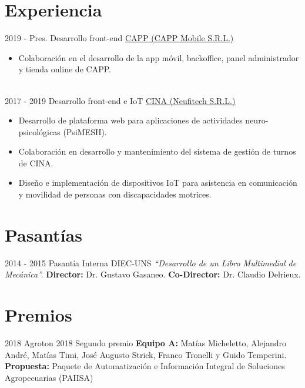 \documentclass[letterpaper]{twentysecondcv} %
\begin{document}
\section{Experiencia}
\begin{twenty} 
\twentyitem
        {2019 - Pres.}
        {}
        {Desarrollo front-end}
        {\href{http://www.webcapp.com/}{CAPP (CAPP Mobile S.R.L.)}}
        {}
        {\begin{itemize}
        \item Colaboración en el desarrollo de la app móvil, backoffice, panel administrador y tienda online de CAPP.
        \end{itemize}}\\
\twentyitem
        {2017 - 2019}
        {}
        {Desarrollo front-end e IoT}
        {\href{http://www.cinaweb.org/}{CINA (Neufitech S.R.L.)}}
        {}
        {\begin{itemize}
        \item Desarrollo de plataforma web para aplicaciones de actividades neuro-psicológicas (PsiMESH).
        \item Colaboración en desarrollo y mantenimiento del sistema de gestión de turnos de CINA.
        \item Diseño e implementación de dispositivos IoT para asistencia en comunicación y movilidad de personas con discapacidades motrices.
        \end{itemize}}
\end{twenty}

\vspace{2mm}

\section{Pasantías}
\begin{twenty}
    \twentyitem
        {2014 - 2015}
        {}
        {Pasantía Interna}
        {DIEC-UNS}
        {\textit{``Desarrollo de un Libro Multimedial de Mecánica''.}}
        {\textbf{Director:} Dr. Gustavo Gasaneo. \textbf{Co-Director:} Dr. Claudio Delrieux.} \\
\end{twenty}

\section{Premios}
\begin{twenty}
    \twentyitem
        {2018}
        {}
        {Agroton 2018}
        {Segundo premio}
        {\textbf{Equipo A:} Matías Micheletto, Alejandro André, Matías Timi, José Augusto Strick, Franco Tronelli y Guido Temperini.}
        {\textbf{Propuesta:} Paquete de Automatización e Información Integral de Soluciones Agropecuarias (PAIISA)}
\end{twenty}
\end{document}
